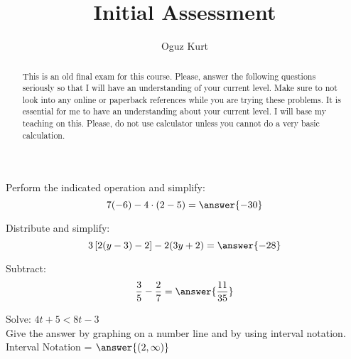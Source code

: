 \documentclass{ximera}
\title{Initial Assessment}
\author{Oguz Kurt}
\begin{document}
\begin{abstract}
This is an old final exam for this course. Please, answer the following questions seriously so that I will have an understanding of your current level. Make sure to not look into any online or paperback references while you are trying these problems. It is essential for me to have an understanding about your current level. I will base my teaching on this. Please, do not use calculator unless you cannot do a very basic calculation. 
\end{abstract}
\maketitle

\begin{problem}
Perform the indicated operation and simplify: \hspace{1cm} 
$$ 7(-6) - 4 \cdot (2 - 5) =\answer{-30}$$


\end{problem}



\begin{problem}
Distribute and simplify: \hspace{1cm} 
$$3 \left [ 2 (y - 3) - 2 \right ] - 2 (3y + 2)=\answer{-28}$$





\end{problem}



\begin{problem}
Subtract: \hspace{1cm} 
$$\displaystyle \frac{3}{5} - \frac{2}{7}=\answer{\frac{11}{35}}$$





\end{problem}



\begin{problem}
Solve: \hspace{1cm} $4t + 5 < 8 t -3$\\

Give the answer by graphing on a number line and by using interval notation. \\

Interval Notation = $\answer{(2,\infty)}$





\end{problem}
\end{document}
